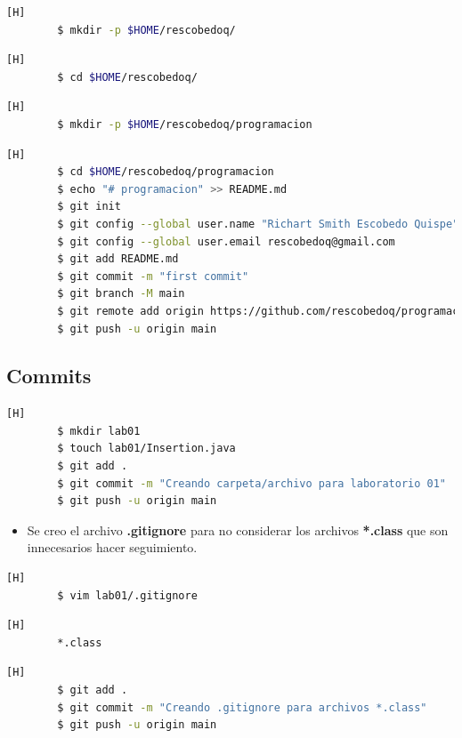 \documentclass{article}
\begin{document}
	\begin{lstlisting}[language=bash,caption={Creando directorio de trabajo}][H]
		$ mkdir -p $HOME/rescobedoq/
	\end{lstlisting}
	\begin{lstlisting}[language=bash,caption={Dirijíéndonos al directorio de trabajo}][H]
		$ cd $HOME/rescobedoq/
	\end{lstlisting}	
	\begin{lstlisting}[language=bash,caption={Creando directorio para repositorio GitHub}][H]
		$ mkdir -p $HOME/rescobedoq/programacion
	\end{lstlisting}
	\begin{lstlisting}[language=bash,caption={Inicializando directorio para repositorio GitHub}][H]
		$ cd $HOME/rescobedoq/programacion
		$ echo "# programacion" >> README.md
		$ git init
		$ git config --global user.name "Richart Smith Escobedo Quispe"
		$ git config --global user.email rescobedoq@gmail.com
		$ git add README.md
		$ git commit -m "first commit"
		$ git branch -M main
		$ git remote add origin https://github.com/rescobedoq/programacion.git
		$ git push -u origin main
	\end{lstlisting}
	
	\subsection{Commits}
	\begin{lstlisting}[language=bash,caption={Primer Commit Creando carpeta/archivo para laboratorio 01}][H]
		$ mkdir lab01
		$ touch lab01/Insertion.java
		$ git add .
		$ git commit -m "Creando carpeta/archivo para laboratorio 01"			
		$ git push -u origin main
	\end{lstlisting}
	
	\begin{itemize}	
		\item Se creo el archivo \textbf{.gitignore} para no considerar los archivos \textbf{*.class} que son innecesarios hacer seguimiento.
	\end{itemize}
	\begin{lstlisting}[language=bash,caption={Creando .gitignore}][H]
		$ vim lab01/.gitignore
	\end{lstlisting}
	\begin{lstlisting}[language=bash,caption={lab01/.gitignore}][H]
		*.class
	\end{lstlisting}
	\begin{lstlisting}[language=bash,caption={Commit: Creando .gitignore para archivos *.class}][H]
		$ git add .
		$ git commit -m "Creando .gitignore para archivos *.class"			
		$ git push -u origin main
	\end{lstlisting}
	
\end{document}
